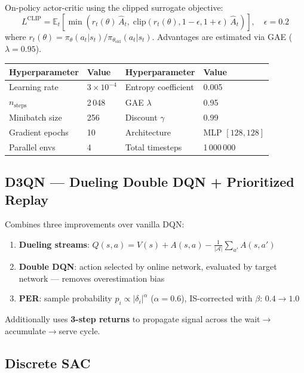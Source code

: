 \documentclass[11pt,a4paper]{article}
\begin{document}
On-policy actor-critic using the clipped surrogate objective:
\begin{equation}
  L^\text{CLIP} = \mathbb{E}_t\!\left[
    \min\!\left(r_t(\theta)\,\hat{A}_t,\;
    \text{clip}(r_t(\theta), 1{-}\epsilon, 1{+}\epsilon)\,\hat{A}_t
    \right)
  \right], \quad \epsilon = 0.2
\end{equation}
where $r_t(\theta) = \pi_\theta(a_t|s_t) / \pi_{\theta_\text{old}}(a_t|s_t)$.
Advantages are estimated via GAE ($\lambda=0.95$).

\medskip
\begin{tabular}{@{}llll@{}}
\toprule
\textbf{Hyperparameter} & \textbf{Value} & \textbf{Hyperparameter} & \textbf{Value} \\
\midrule
Learning rate & $3\times10^{-4}$ & Entropy coefficient & 0.005 \\
$n_\text{steps}$ & 2\,048 & GAE $\lambda$ & 0.95 \\
Minibatch size & 256 & Discount $\gamma$ & 0.99 \\
Gradient epochs & 10 & Architecture & MLP $[128,128]$ \\
Parallel envs & 4 & Total timesteps & 1\,000\,000 \\
\bottomrule
\end{tabular}

\subsection{D3QN — Dueling Double DQN + Prioritized Replay}

Combines three improvements over vanilla DQN:
\begin{enumerate}[noitemsep]
  \item \textbf{Dueling streams}: $Q(s,a) = V(s) + A(s,a) - \frac{1}{|\mathcal{A}|}\sum_{a'}A(s,a')$
  \item \textbf{Double DQN}: action selected by online network, evaluated by target
        network — removes overestimation bias
  \item \textbf{PER}: sample probability $p_i \propto |\delta_i|^\alpha$
        ($\alpha=0.6$), IS-corrected with $\beta$: $0.4\to1.0$
\end{enumerate}
Additionally uses \textbf{3-step returns} to propagate signal across the
wait$\to$accumulate$\to$serve cycle.

\subsection{Discrete SAC}
\end{document}
